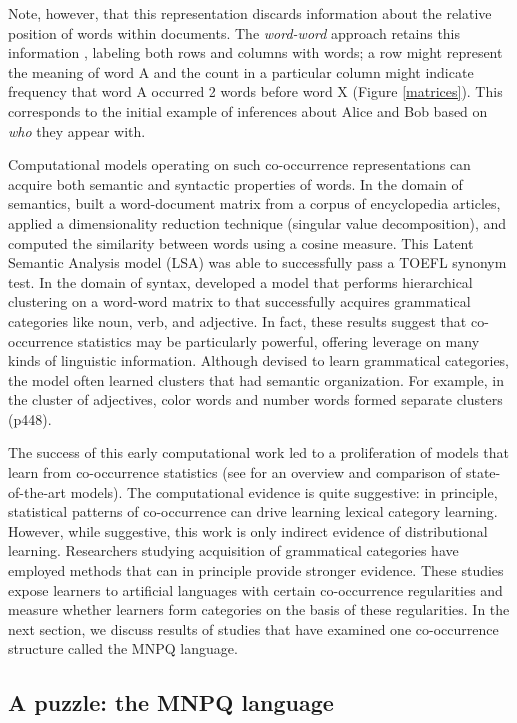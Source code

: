 \documentclass[man,floatsintext]{apa6}
\begin{document}
Note, however, that this representation discards information about the relative position of words within documents. The \emph{word-word} approach retains this information \citep{church1990, schutze1992}, labeling both rows and columns with words; a row might represent the meaning of word A and the count in a particular column might indicate frequency that word A occurred 2 words before word X (Figure \ref{matrices}). This corresponds to the initial example of inferences about Alice and Bob based on \emph{who} they appear with.

Computational models operating on such co-occurrence representations can acquire both semantic and syntactic properties of words. In the domain of semantics, \citet{landauer1997} built a word-document matrix from a corpus of encyclopedia articles, applied a dimensionality reduction technique (singular value decomposition), and computed the similarity between words using a cosine measure. This Latent Semantic Analysis model (LSA) was able to successfully pass a TOEFL synonym test. In the domain of syntax, \citet{redington1998} developed a model that performs hierarchical clustering on a word-word matrix to that successfully acquires grammatical categories like noun, verb, and adjective. In fact, these results suggest that co-occurrence statistics may be particularly powerful, offering leverage on many kinds of linguistic information. Although devised to learn grammatical categories, the model often learned clusters that had semantic organization. For example, in the cluster of adjectives, color words and number words formed separate clusters (p448).

The success of this early computational work led to a proliferation of models that learn from co-occurrence statistics (see \citealp{riordan2010} for an overview and comparison of state-of-the-art models). The computational evidence is quite suggestive: in principle, statistical patterns of co-occurrence can drive learning lexical category learning. However, while suggestive, this work is only indirect evidence of distributional learning. Researchers studying acquisition of grammatical categories have employed methods that can in principle provide stronger evidence. These studies expose learners to artificial languages with certain co-occurrence regularities and measure whether learners form categories on the basis of these regularities. In the next section, we discuss results of studies that have examined one co-occurrence structure called the MNPQ language.

\subsection{A puzzle: the MNPQ language}
\end{document}
